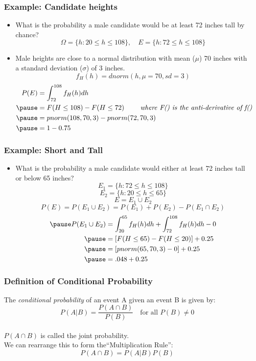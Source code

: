 \documentclass[aspectratio=169, handout]{beamer}
\numberwithin{equation}{section}
\begin{document}
\begin{frame}
\frametitle{Example: Candidate heights}
\begin{itemize}
\item What is the probability a male candidate would be at least 72 inches tall by chance?
$$\Omega = \{h: 20 \leq h \leq 108\}, \quad E = \{h: 72 \leq h \leq 108\}$$
\item Male heights are close to a normal distribution with mean ($\mu$) 70 inches with a standard deviation ($\sigma$) of 3 inches.
$$f_H(h) =dnorm(h, \mu= 70, sd = 3)$$
\begin{align*}
P(E)&=\int_{72}^{108} f_H(h) dh\\\pause
&= F(H \leq 108)-F(H \leq 72) \ \quad \quad \textit{where F() is the anti-derivative of f()}\\\pause
&=pnorm(108, 70, 3) - pnorm(72, 70, 3)\\\pause
&=1-0.75
\end{align*}
\end{itemize}
\end{frame}


\begin{frame}
\frametitle{Example: Short and Tall}
\begin{itemize}
\item What is the probability a male candidate would either at least 72 inches tall or below 65 inches?
$$E_1 = \{h: 72 \leq h \leq 108\}$$
$$E_2 = \{h: 20 \leq h \leq 65\}$$\pause
$$E= E_1\cup E_2$$
$$P(E)= P(E_1\cup E_2)=P(E_1)+P(E_2)-P(E_1\cap E_2)$$
\begin{align*}\pause
P(E_1\cup E_2)&=\int_{20}^{65} f_H(h) dh+\int_{72}^{108} f_H(h) dh-0\\\pause
&= [F(H \leq 65)-F(H \leq 20)]+0.25\\\pause
&=[pnorm(65, 70, 3)-0] +0.25\\\pause
&=.048+0.25
\end{align*}
\end{itemize}
\end{frame}


\begin{frame}
\frametitle{Definition of Conditional Probability}
The \emph{conditional probability} of an event A given an event B is given by:
$$P(A|B)=\frac{P(A\cap B)}{P(B)}\quad \text{for all }P(B)\neq 0$$
\\
$P(A\cap B)$ is called the joint probability.\\
\pause We can rearrange this to form the``Multiplication Rule'':
$$P(A\cap B)=P(A|B)P(B)$$

\end{frame}
\end{document}
